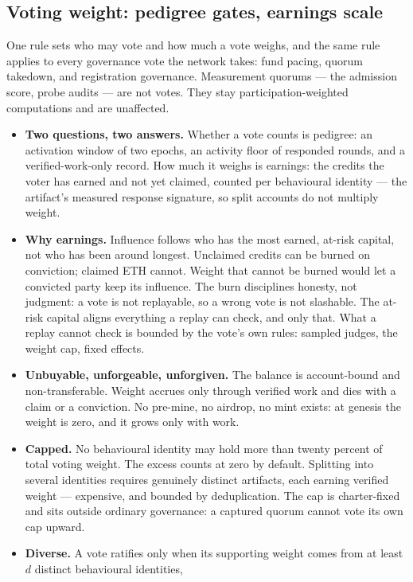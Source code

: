 \documentclass[11pt]{article}
\begin{document}
\subsection{Voting weight: pedigree gates, earnings scale}

One rule sets who may vote and how much a vote weighs, and the
same rule applies to every governance vote the network takes:
fund pacing, quorum takedown, and registration governance.
Measurement quorums --- the admission score, probe audits --- are
not votes. They stay participation-weighted computations and are
unaffected.

\begin{itemize}
\item \textbf{Two questions, two answers.} Whether a vote counts
is pedigree: an activation window of two epochs, an activity
floor of responded rounds, and a verified-work-only record. How
much it weighs is earnings: the credits the voter has earned and
not yet claimed, counted per behavioural identity --- the
artifact's measured response signature, so split accounts do not
multiply weight.
\item \textbf{Why earnings.} Influence follows who has the most
earned, at-risk capital, not who has been around longest.
Unclaimed credits can be burned on conviction; claimed ETH
cannot. Weight that cannot be burned would let a convicted party
keep its influence. The burn disciplines honesty, not judgment:
a vote is not replayable, so a wrong vote is not slashable. The
at-risk capital aligns everything a replay can check, and only
that. What a replay cannot check is bounded by the vote's own
rules: sampled judges, the weight cap, fixed effects.
\item \textbf{Unbuyable, unforgeable, unforgiven.} The balance
is account-bound and non-transferable. Weight accrues only
through verified work and dies with a claim or a conviction. No
pre-mine, no airdrop, no mint exists: at genesis the weight is
zero, and it grows only with work.
\item \textbf{Capped.} No behavioural identity may hold more
than twenty percent of total voting weight. The excess counts at
zero by default. Splitting into several identities requires
genuinely distinct artifacts, each earning verified weight ---
expensive, and bounded by deduplication. The cap is
charter-fixed and sits outside ordinary governance: a captured
quorum cannot vote its own cap upward.
\item \textbf{Diverse.} A vote ratifies only when its supporting
weight comes from at least $d$ distinct behavioural identities,

\end{itemize}
\end{document}
